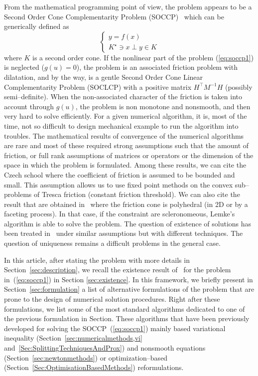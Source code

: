 From the mathematical programming point of view, the problem appears to be a Second Order Cone Complementarity Problem (SOCCP)~\cite{Facchinei.Pang2003} which can be generically defined as
\begin{equation}
  \begin{cases}
    y =f(x) \\
    K^\star \ni x \perp y \in K
  \end{cases}
\end{equation}
where $K$ is a second order cone. If the nonlinear part of the problem (\ref{eq:soccp1}) is neglected ($g(u)=0$), the problem is an associated friction problem with dilatation, and by the way, is a gentle Second Order Cone Linear Complementarity Problem (SOCLCP) with a positive matrix $H^\top M^{-1} H$ (possibly semi--definite). When the non-associated character of the friction is taken into account through $g(u)$, the problem is non monotone and nonsmooth, and then very hard to solve efficiently. For a given numerical algorithm, it is, most of the time,  not so difficult to design mechanical example to run the algorithm into troubles. The mathematical results of convergence of the numerical algorithms are rare and most of these required strong assumptions such that  the amount of friction, or full rank assumptions of matrices or operators or the dimension of the space in which the problem is formulated. Among these results, we can cite the Czech school where the coefficient of friction is assumed to be bounded and small. This assumption allows us to use fixed point methods on the convex sub--problems of Tresca friction (constant friction threshold). We can also cite the result that are obtained in~\cite{Pang.Trinkle1996,Stewart.Trinkle1996,Anitescu.Potra97} where the friction cone is polyhedral (in 2D or by a faceting process). In that case, if the constraint are scleronomeous, Lemke's algorithm is able to solve the problem. The question of existence of solutions has been treated in~\cite{Klarbring.Pang1998,Acary.ea_ZAMM2011} under similar assumptions but with different techniques. The question of uniqueness remains a difficult problems in the general case.


In this article,  after stating the problem with more details in Section~\ref{sec:description}, we recall the existence result of~\cite{Acary.ea_ZAMM2011} for the problem in~(\ref{eq:soccp1}) in Section \ref{sec:existence}. In this framework, we briefly present in Section~\ref{sec:formulation} a list of alternative formulations of the problem that are prone to the design of numerical solution procedures. Right after these formulations, we list some of the most standard algorithms dedicated to one of the previous formulation in Section. These algorithms that have been previously developed for solving the SOCCP~(\ref{eq:soccp1}) mainly based  variational inequality (Section~\ref{sec:numericalmethods,vi} and~\ref{Sec:SplittingTechniquesAndProx}) and nonsmooth equations (Section~\ref{sec:newtonmethods}) or  optimization--based (Section~\ref{Sec:OptimisationBasedMethods}) reformulations.  

